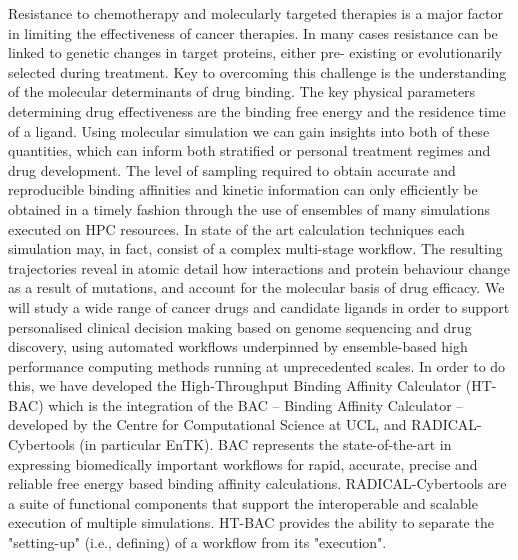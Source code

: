 Resistance to chemotherapy and molecularly targeted therapies is a major
factor in limiting the effectiveness of cancer therapies. In many cases
resistance can be linked to genetic changes in target proteins, either pre-
existing or evolutionarily selected during treatment. Key to overcoming this
challenge is the understanding of the molecular determinants of drug binding.
The key physical parameters determining drug effectiveness are the binding
free energy and the residence time of a ligand. Using molecular simulation we
can gain insights into both of these quantities, which can inform both
stratified or personal treatment regimes and drug development. The level of
sampling required to obtain accurate and reproducible binding affinities and
kinetic information can only efficiently be obtained in a timely fashion
through the use of ensembles of many simulations executed on HPC resources. In
state of the art calculation techniques each simulation may, in fact, consist
of a complex multi-stage workflow. The resulting trajectories reveal in atomic
detail how interactions and protein behaviour change as a result of mutations,
and account for the molecular basis of drug efficacy. We will study a wide
range of cancer drugs and candidate ligands in order to support personalised
clinical decision making based on genome sequencing and drug discovery, using
automated workflows underpinned by ensemble-based high performance computing
methods running at unprecedented scales. In order to do this, we have
developed the High-Throughput Binding Affinity Calculator (HT-BAC) which is
the integration of the BAC -- Binding Affinity Calculator -- developed by the
Centre for Computational Science at UCL, and RADICAL-Cybertools (in particular
EnTK). BAC represents the state-of-the-art in expressing biomedically
important workflows for rapid, accurate, precise and reliable free energy
based binding affinity calculations. RADICAL-Cybertools are a suite of
functional components that support the interoperable and scalable execution of
multiple simulations. HT-BAC provides the ability to separate the "setting-up"
(i.e., defining) of a workflow from its "execution".
